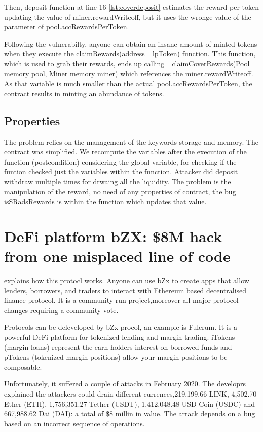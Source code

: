 Then, deposit function at line 16 \autoref{lst:coverdeposit} estimates the reward per token updating the value of miner.rewardWriteoff, 
but it uses the wronge value of the parameter of pool.accRewardsPerToken.

Following the vulnerabilty, anyone can obtain an insane amount of minted tokens when they execute the claimRewards(address \_lpToken) function. 
This function, which is used to grab their rewards, ends up calling \_claimCoverRewards(Pool memory pool, Miner memory miner) which references the miner.rewardWriteoff. 
As that variable is much smaller than the actual pool.accRewardsPerToken, the contract results in minting an abundance of tokens.

\subsection{Properties}
The problem relies on the management of the keywords storage and memory. The contract was simplified. 
We recompute the variables after the execution of the function (postcondition) considering the global variable, for checking if the funtion checked just the variables within the function. 
Attacker did deposit withdraw multiple times for drwaing all the liquidity. The problem is the manipulation of the reward, no need of any properties of contract, the bug isSRadsRewards 
is within the function which updates that value.

\section{DeFi platform bZX: \$8M hack from one misplaced line of code}
\label{sec:Exploits:bZX}

\citet{bZxProtocol} explains how this protocl works. 
Anyone can use bZx to create apps that allow lenders, borrowers, and traders to interact with Ethereum based 
decentralised finance protocol.
It is a community-run project,moreover all major protocol changes requiring a community vote. 

Protocols can be deleveloped by bZx procol, an example is Fulcrum. 
It is a powerful DeFi platform for tokenized lending and margin trading. 
iTokens (margin loans) represent the earn holders interest on borrowed funds and pTokens (tokenized margin positions) allow your margin positions to be composable.

Unfortunately, it suffered a couple of attacks in February 2020.
The developrs explained the attackers could drain different currences,219,199.66 LINK, 4,502.70 Ether (ETH), 1,756,351.27 Tether (USDT), 
1,412,048.48 USD Coin (USDC) and 667,988.62 Dai (DAI): a total of \$8 millin in value. 
The arrack depends on a bug based on an incorrect sequence of operations.

